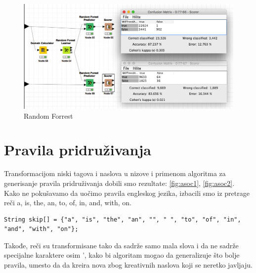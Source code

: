 \documentclass[a4paper]{article}
\theoremstyle{definition}
\begin{document}
\begin{figure}[H]
\begin{center}
    \includegraphics[width=1\textwidth]{Random_Forrest.png}
    \caption{Random Forrest}
\end{center}
\label{fig:randomForrest}
\end{figure}


\section{Pravila pridruživanja}
\label{sec:pravila}

Transformacijom niski tagova i naslova u nizove i primenom algoritma za generisanje pravila pridruživanja dobili smo rezultate: \ref{fig:asoc1}, \ref{fig:asoc2}.
\\
Kako ne pokušavamo da uočimo pravila engleskog jezika, izbacili smo iz pretrage reči a, is, the, an, to, of, in, and, with, on.
\begin{lstlisting}
String skip[] = {"a", "is", "the", "an", "", " ", "to", "of", "in", "and", "with", "on"};
\end{lstlisting}
Takođe, reči su transformisane tako da sadrže samo mala slova i da ne sadrže specijalne karaktere osim ', kako bi algoritam mogao da generalizuje što bolje pravila, umesto da da kreira nova zbog kreativnih naslova koji se neretko javljaju.

\end{document}
